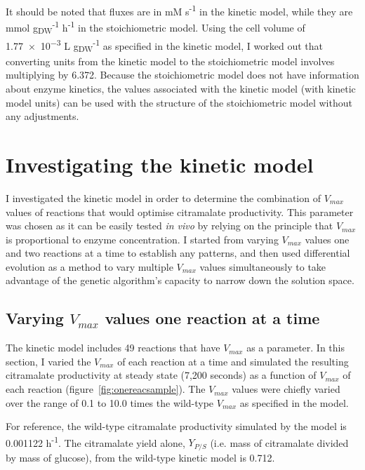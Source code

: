 \documentclass[parskip=full, numbers=noenddot]{scrreprt}
\begin{document}
It should be noted that fluxes are in mM s\textsuperscript{-1} in the kinetic model, while they are mmol g\textsubscript{DW}\textsuperscript{-1} h\textsuperscript{-1} in the stoichiometric model. Using the cell volume of \num{1.77e-3} L g\textsubscript{DW}\textsuperscript{-1} as specified in the kinetic model, I worked out that converting units from the kinetic model to the stoichiometric model involves multiplying by 6.372. Because the stoichiometric model does not have information about enzyme kinetics, the values associated with the kinetic model (with kinetic model units) can be used with the structure of the stoichiometric model without any adjustments.

\chapter{Investigating the kinetic model}
\label{ch:kinetic}

I investigated the kinetic model in order to determine the combination of $V_{max}$ values of reactions that would optimise citramalate productivity. This parameter was chosen as it can be easily tested \emph{in vivo} by relying on the principle that $V_{max}$ is proportional to enzyme concentration. I started from varying $V_{max}$ values one and two reactions at a time to establish any patterns, and then used differential evolution as a method to vary multiple $V_{max}$ values simultaneously to take advantage of the genetic algorithm's capacity to narrow down the solution space.

\section{Varying $V_{max}$ values one reaction at a time}
\label{sec:onereac}

The kinetic model includes 49 reactions that have $V_{max}$ as a parameter. In this section, I varied the $V_{max}$ of each reaction at a time and simulated the resulting citramalate productivity at steady state (7,200 seconds) as a function of $V_{max}$ of each reaction (figure~\ref{fig:onereacsample}). The $V_{max}$ values were chiefly varied over the range of 0.1 to 10.0 times the wild-type $V_{max}$ as specified in the model.

For reference, the wild-type citramalate productivity simulated by the model is 0.001122 h\textsuperscript{-1}.
The citramalate yield alone, $Y_{P/S}$ (i.e. mass of citramalate divided by mass of glucose), from the wild-type kinetic model is 0.712.
\end{document}
